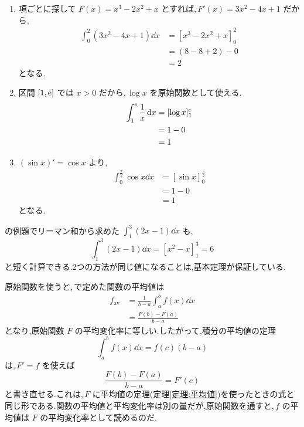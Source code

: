 \begin{enumerate}[label=(\arabic*),leftmargin=*]
 \item 項ごとに探して $F(x)=x^3-2x^2+x$ とすれば,\,$F'(x)=3x^2-4x+1$ だから,
 \begin{align*}
  \int_0^2(3x^2-4x+1)\dd x
  &=\left[x^3-2x^2+x\right]_0^2\\
  &=(8-8+2)-0\\
  &=2
 \end{align*}
 となる.
 \item 区間 $[1,\mathrm{e}]$ では $x>0$ だから,\,$\log x$ を原始関数として使える.
 \begin{align*}
  \int_1^{\mathrm{e}}\frac1x\,\mathrm{d} x
  &=[\log x]_1^{\mathrm{e}}\\
  &=1-0\\
  &=1
 \end{align*}
 \item $(\sin x)'=\cos x$ より,
 \begin{align*}
  \int_0^{\frac\pi2}\cos x\dd x
  &=[\sin x]_0^{\frac\pi2}\\
  &=1-0\\
  &=1
 \end{align*}
 となる.
\end{enumerate}

の例題でリーマン和から求めた $\int_1^3(2x-1)\dd x$ も,
\[
 \int_1^3(2x-1)\dd x=\left[x^2-x\right]_1^3=6
\]
と短く計算できる.2つの方法が同じ値になることは,基本定理が保証している.

原始関数を使うと,\,で定めた関数の平均値は
\begin{align*}
 f_{\mathrm{av}}
 &=\frac1{b-a}\int_a^b f(x)\dd x\\
 &=\frac{F(b)-F(a)}{b-a}
\end{align*}
となり,原始関数 $F$ の平均変化率に等しい.したがって,積分の平均値の定理
\[
 \int_a^b f(x)\dd x=f(c)(b-a)
\]
は,\,$F'=f$ を使えば
\[
 \frac{F(b)-F(a)}{b-a}=F'(c)
\]
と書き直せる.これは,\,$F$ に平均値の定理(定理\ref{定理:平均値})を使ったときの式と同じ形である.関数の平均値と平均変化率は別の量だが,原始関数を通すと,\,$f$ の平均値は $F$ の平均変化率として読めるのだ.
